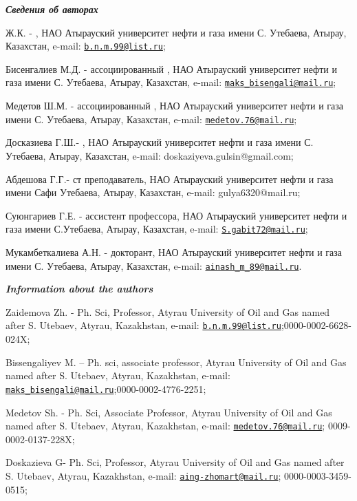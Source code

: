 \begin{authorinfo}
\emph{{\bfseries Сведения об авторах}}

Ж.К. - , НАО
Атырауский университет нефти и газа имени С. Утебаева, Атырау,
Казахстан, e-mail:
\href{mailto:b.n.m.99@list.ru}{\nolinkurl{b.n.m.99@list.ru}};

Бисенгалиев М.Д. -  ассоциированный
, НАО Атырауский университет нефти и газа имени С.
Утебаева, Атырау, Казахстан, e-mail:
\href{mailto:maks\_bisengali@mail.ru}{\nolinkurl{maks\_bisengali@mail.ru}};

Медетов Ш.М. -  ассоциированный
, НАО Атырауский университет нефти и газа имени С.
Утебаева, Атырау, Казахстан, e-mail:
\href{mailto:medetov.76@mail.ru}{\nolinkurl{medetov.76@mail.ru}};

Досказиева Г.Ш.- , НАО
Атырауский университет нефти и газа имени С. Утебаева, Атырау,
Казахстан, e-mail:
doskaziyeva.gulsin@gmail.com;

Абдешова Г.Г.- ст преподаватель, НАО Атырауский университет нефти и газа
имени Сафи Утебаева, Атырау, Казахстан, e-mail:
gulya6320@mail.ru;

Суюнгариев Г.Е. -  ассистент профессора,
НАО Атырауский университет нефти и газа имени С.Утебаева, Атырау,
Казахстан, e-mail:
\href{mailto:S.gabit72@mail.ru}{\nolinkurl{S.gabit72@mail.ru}};

Мукамбеткалиева А.Н. - докторант, НАО Атырауский университет нефти и
газа имени С. Утебаева, Атырау, Казахстан, e-mail:
\href{mailto:ainash\_m_89@mail.ru}{\nolinkurl{ainash\_m\_89@mail.ru}}.

\emph{{\bfseries Information about the authors}}

Zaidemova Zh. - Ph. Sci, Professor, Atyrau Uni󠀁versity of Oil and Gas
nam󠀁ed aft󠀁er S. Ute󠀁baev, Aty󠀁rau, Kaz󠀁akhstan, e-mail:
\href{mailto:b.n.m.99@list.ru}{\nolinkurl{b.n.m.99@list.ru}};0000-0002-6628-024X;

Bissengaliyev M. -- Ph. sci, associate professor, Atyrau Uni󠀁versity of
Oil and Gas nam󠀁ed aft󠀁er S. Ute󠀁baev, Aty󠀁rau, Kaz󠀁akhstan, e-mail:
\href{mailto:maks\_bisengali@mail.ru}{\nolinkurl{maks\_bisengali@mail.ru}};0000-0002-4776-2251;

Medetov Sh. - Ph. Sci, Associate Professor, Atyrau Uni󠀁versity of Oil and
Gas nam󠀁ed aft󠀁er S. Ute󠀁baev, Aty󠀁rau, Kaz󠀁akhstan, e-mail:
\href{mailto:medetov.76@mail.ru}{\nolinkurl{medetov.76@mail.ru}};
0009-0002-0137-228X;

Doskazieva G- Ph. Sci, Professor, Atyrau Uni󠀁versity of Oil and Gas nam󠀁ed
aft󠀁er S. Ute󠀁baev, Aty󠀁rau, Kaz󠀁akhstan, e-mail:
\href{mailto:aing-zhomart@mail.ru}{\nolinkurl{aing-zhomart@mail.ru}};
0000-0003-3459-0515;


\end{authorinfo}
